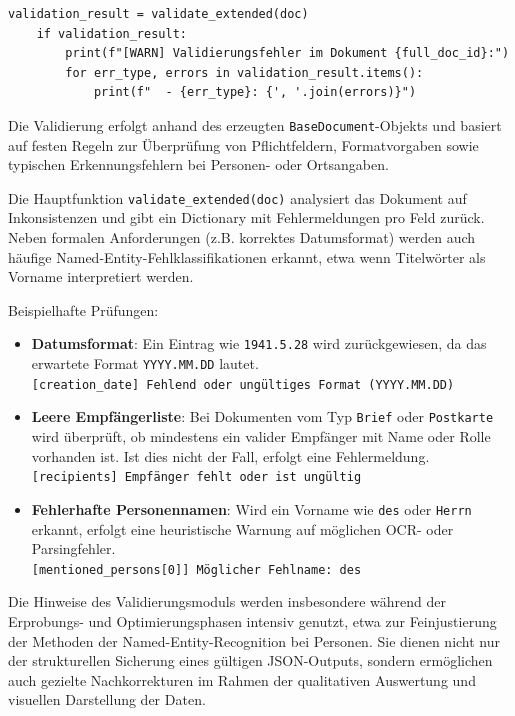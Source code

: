 \documentclass[12pt, a4paper, ngerman, bidi=default]{article}
\newcommand{\code}[1]{\colorbox{VeryLightGray}{\texttt{#1}}} %
\begin{document}
\begin{verbatim}
validation_result = validate_extended(doc)
    if validation_result:
        print(f"[WARN] Validierungsfehler im Dokument {full_doc_id}:")
        for err_type, errors in validation_result.items():
            print(f"  - {err_type}: {', '.join(errors)}")

\end{verbatim}

Die Validierung erfolgt anhand des erzeugten \code{BaseDocument}-Objekts und basiert auf festen Regeln zur Überprüfung von Pflichtfeldern, Formatvorgaben sowie typischen Erkennungsfehlern bei Personen- oder Ortsangaben.

Die Hauptfunktion \code{validate\_extended(doc)} analysiert das Dokument auf Inkonsistenzen und gibt ein Dictionary mit Fehlermeldungen pro Feld zurück. Neben formalen Anforderungen (z.B. korrektes Datumsformat) werden auch häufige Named-Entity-Fehlklassifikationen erkannt, etwa wenn Titelwörter als Vorname interpretiert werden.

Beispielhafte Prüfungen:

\begin{itemize}
    \item \textbf{Datumsformat}: Ein Eintrag wie \texttt{1941.5.28} wird zurückgewiesen, da das erwartete Format \texttt{YYYY.MM.DD} lautet.\\
    \texttt{[creation\_date] Fehlend oder ungültiges Format (YYYY.MM.DD)}

    \item \textbf{Leere Empfängerliste}: Bei Dokumenten vom Typ \texttt{Brief} oder \texttt{Postkarte} wird überprüft, ob mindestens ein valider Empfänger mit Name oder Rolle vorhanden ist. Ist dies nicht der Fall, erfolgt eine Fehlermeldung.\\
    \texttt{[recipients] Empfänger fehlt oder ist ungültig}

    \item \textbf{Fehlerhafte Personennamen}: Wird ein Vorname wie \texttt{des} oder \texttt{Herrn} erkannt, erfolgt eine heuristische Warnung auf möglichen OCR- oder Parsingfehler.\\
    \texttt{[mentioned\_persons[0]] Möglicher Fehlname: des}
\end{itemize}

Die Hinweise des Validierungsmoduls werden insbesondere während der Erprobungs- und Optimierungsphasen intensiv genutzt, etwa zur Feinjustierung der Methoden der Named-Entity-Recognition bei Personen. Sie dienen nicht nur der strukturellen Sicherung eines gültigen JSON-Outputs, sondern ermöglichen auch gezielte Nachkorrekturen im Rahmen der qualitativen Auswertung und visuellen Darstellung der Daten.
\end{document}
